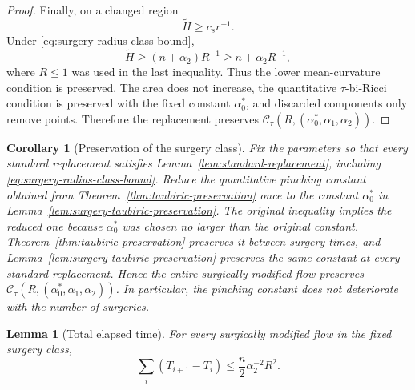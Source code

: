 \documentclass[11pt,reqno]{amsart}
\newtheorem{lemma}[proposition]{Lemma}
\newtheorem{corollary}[proposition]{Corollary}
\theoremstyle{definition}
\theoremstyle{remark}
\numberwithin{equation}{section}
\newcommand{\CC}{\mathcal C}
\begin{document}
\begin{proof}
  Finally, on a changed region
  \begin{equation*}
  \widetilde H\geq c_sr^{-1}.
  \end{equation*}
  Under \eqref{eq:surgery-radius-class-bound},
  \begin{equation*}
  \widetilde H
  \geq
  (n+\alpha_2)R^{-1}
  \geq
  n+\alpha_2R^{-1},
  \end{equation*}
  where $R\leq1$ was used in the last inequality.  Thus the lower
  mean-curvature condition is preserved.  The area does not increase,
  the quantitative $\tau$-bi-Ricci condition is preserved with the fixed
  constant $\alpha_0^*$, and discarded components only remove points.
  Therefore the replacement preserves
  $\CC_\tau(R,(\alpha_0^*,\alpha_1,\alpha_2))$.
\end{proof}


\begin{corollary}[Preservation of the surgery class]
  \label{cor:surgery-class-preserved}
  Fix the parameters so that every standard replacement satisfies
  Lemma~\ref{lem:standard-replacement}, including
  \eqref{eq:surgery-radius-class-bound}.   Reduce the quantitative pinching constant obtained from
  Theorem~\ref{thm:taubiric-preservation} once to the constant
  $\alpha_0^*$ in Lemma~\ref{lem:surgery-taubiric-preservation}.  The original
  inequality implies the reduced one because $\alpha_0^*$ was chosen no
  larger than the original constant.  Theorem~\ref{thm:taubiric-preservation}
  preserves it between surgery times, and
  Lemma~\ref{lem:surgery-taubiric-preservation} preserves the same constant at
  every standard replacement.  Hence the entire surgically modified flow
  preserves
  $\CC_\tau(R,(\alpha_0^*,\alpha_1,\alpha_2))$.  In particular, the pinching
  constant does not deteriorate with the number of surgeries.
\end{corollary}


\begin{lemma}[Total elapsed time]\label{lem:surgery-time-upper}
  For every surgically modified flow in the fixed surgery class,
  \begin{equation}\label{eq:surgery-total-time}
    \sum_i(T_{i+1}-T_i)
    \leq
    \frac n2\alpha_2^{-2}R^2.
  \end{equation}
\end{lemma}
\end{document}
